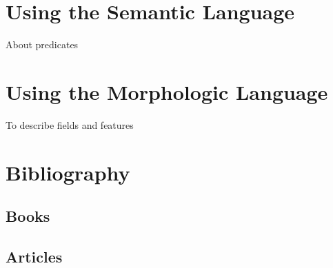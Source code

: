 \documentclass[11pt,fleqn]{book} %
\begin{document}
\chapter{Using the Semantic Language}

About predicates

\chapter{Using the Morphologic Language}

To describe fields and features





\chapter*{Bibliography}
\section*{Books}
\printbibliography[heading=bibempty,type=book]
\section*{Articles}
\printbibliography[heading=bibempty,type=article]


\cleardoublepage
\setlength{\columnsep}{0.75cm}
\printindex

\end{document}
